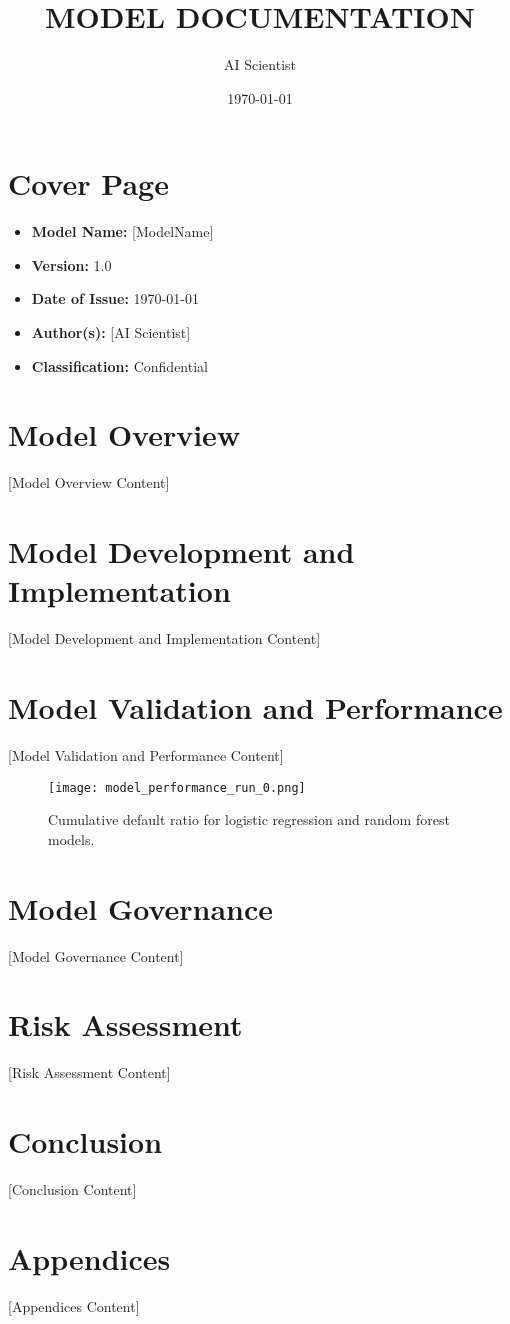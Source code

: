 \documentclass[a4paper,12pt]{article}
\begin{document}
\title{MODEL DOCUMENTATION}
\author{AI Scientist}
\date{\today}
\maketitle

\section*{Cover Page}
\begin{itemize}
    \item \textbf{Model Name:} [ModelName]
    \item \textbf{Version:} 1.0
    \item \textbf{Date of Issue:} \today
    \item \textbf{Author(s):} [AI Scientist]
    \item \textbf{Classification:} Confidential
\end{itemize}

\tableofcontents
\clearpage

\section{Model Overview}
[Model Overview Content]

\section{Model Development and Implementation}
[Model Development and Implementation Content]

\section{Model Validation and Performance}
[Model Validation and Performance Content]
\begin{figure}[h]
    \centering
    \texttt{[image: model\_performance\_run\_0.png]}
    \caption{Cumulative default ratio for logistic regression and random forest models.}
    \label{fig:model_performance}
\end{figure}

\section{Model Governance}
[Model Governance Content]

\section{Risk Assessment}
[Risk Assessment Content]

\section{Conclusion}
[Conclusion Content]

\section{Appendices}
[Appendices Content]
\end{document}
